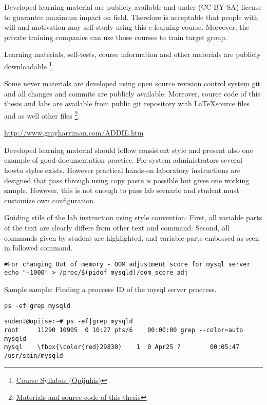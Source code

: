 Developed learning material are publicly available and under (\gls{CC-BY-SA}) license to guarantee maximum impact on field. Therefore is acceptable that people with will and motivation may self-study using this e-learning course. Moreover, the private training companies can use those courses to train target group.

Learning materials, self-tests, course information and other materials are publicly downloadable \footnote{\href{http://elab.itcollege.ee:8000/cyber-course/}{Course Syllabus (Õpijuhis)}}.


Some never materials are developed using open source revision control system \gls{git} and all changes and commits are publicly available. Moreover, source code of this thesis and labs are available from public \gls{git} repository with \LaTeX  source files and as well other files \footnote{\href{https://github.com/magavdraakon/margus-thesis.git}{Materials and source code of this thesis}}.





\url{http://www.grayharriman.com/ADDIE.htm}

Developed learning material should follow consistent style and present also one example of good documentation practice. For system administrators several howto styles exists. However practical hands-on laboratory instructions are designed that pass through using copy paste is possible but gives one working sample. However, this is not enough to pass lab scenario and student must customize own configuration.

Guiding stile of the lab instruction using style convention: First, all variable parts of the text are clearly differs from other text and command. Second, all commands given by student are highlighted, and variable parts embossed as seen in followed command.


\begin{verbatim}
#For changing Out of memory - OOM adjustment score for mysql server
echo "-1000" > /proc/$(pidof mysqld)/oom_score_adj
\end{verbatim}



Sample sample: Finding a proccess ID of the mysql server proccess.

\begin{verbatim}
ps -ef|grep mysqld
\end{verbatim}
\label{code_sample}
%
\small{
\begin{Verbatim}[frame=single,
label=Command output,framesep=2mm,rulecolor=\color{red},commandchars=\\\{\}]
sudent@opiise:~# ps -ef|grep mysqld
root     11290 10905  0 10:27 pts/6    00:00:00 grep --color=auto mysqld
mysql    \fbox{\color{red}29830}    1  0 Apr25 ?        00:05:47 /usr/sbin/mysqld
\end{Verbatim}
%
}

